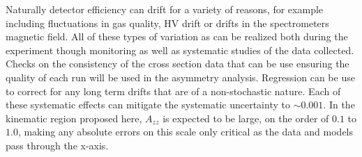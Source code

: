 Naturally detector efficiency can drift for a variety of reasons, for
example including fluctuations in gas quality, HV drift or
drifts in the spectrometers magnetic field.  All of these types of variation as can be realized both
during the experiment though monitoring as well as systematic studies of the data collected.
Checks on the consistency of the cross section data that can be use ensuring the quality of each run will be used in the asymmetry analysis.  Regression can be use to correct for any long term drifts that are of a non-stochastic nature.
Each of these systematic effects can mitigate the systematic uncertainty to $\sim0.001$. 
In the kinematic region proposed here, $A_{zz}$ is expected to be large, on the order of $0.1$ to $1.0$, making any absolute errors on this scale only critical as the data and models pass through the x-axis.  